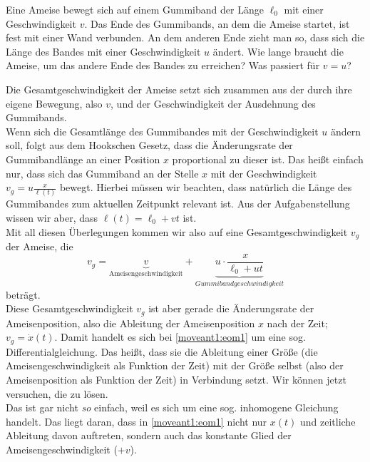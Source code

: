 \begin{Exercise}[label = moveant, origin = Jaan Kalda, difficulty = 3, title = Ameise auf dem Laufband]
	Eine Ameise bewegt sich auf einem Gummiband der Länge $\ell_0$ mit einer Geschwindigkeit $v$. Das Ende des Gummibands, an dem die Ameise startet, ist fest mit einer Wand verbunden. An dem anderen Ende zieht man so, dass sich die Länge des Bandes mit einer Geschwindigkeit $u$ ändert. Wie lange braucht die Ameise, um das andere Ende des Bandes zu erreichen? Was passiert für $v=u$?
\end{Exercise}
\begin{Answer}[ref = moveant]
	Die Gesamtgeschwindigkeit der Ameise setzt sich zusammen aus der durch ihre eigene Bewegung, also $v$, und der Geschwindigkeit der Ausdehnung des Gummibands.\\
	Wenn sich die Gesamtlänge des Gummibandes mit der Geschwindigkeit $u$ ändern soll, folgt aus dem Hookschen Gesetz, dass die Änderungsrate der Gummibandlänge an einer Position $x$ proportional zu dieser ist. Das heißt einfach nur, dass sich das Gummiband an der Stelle $x$ mit der Geschwindigkeit $v_g = u \frac{x}{\ell\left(t\right)}$ bewegt. Hierbei müssen wir beachten, dass natürlich die Länge des Gummibandes zum aktuellen Zeitpunkt relevant ist. Aus der Aufgabenstellung wissen wir aber, dass $\ell\left(t\right) = \ell_0 + v t $ ist. \\
	Mit all diesen Überlegungen kommen wir also auf eine Gesamtgeschwindigkeit $v_g$ der Ameise, die 
	\begin{equation}\label{moveant1:eom1}
	v_g = 	\underbrace{v}_{\mathrm{Ameisengeschwindigkeit}} +\underbrace{u\cdot \frac{x}{\ell_0 + u t}}_{Gummibandgeschwindigkeit}
	\end{equation}
	beträgt.\\
	Diese Gesamtgeschwindigkeit $v_g$ ist aber gerade die Änderungsrate der Ameisenposition, also die Ableitung der Ameisenposition $x$ nach der Zeit; $v_g = \dot{x}\left(t\right)$. Damit handelt es sich bei \eqref{moveant1:eom1} um eine sog. Differentialgleichung. Das heißt, dass sie die Ableitung einer Größe (die Ameisengeschwindigkeit als Funktion der Zeit) mit der Größe selbst (also der Ameisenposition als Funktion der Zeit) in Verbindung setzt. Wir können jetzt versuchen, die zu lösen.\\
	Das ist gar nicht \textit{so} einfach, weil es sich um eine sog. inhomogene Gleichung handelt. Das liegt daran, dass in \eqref{moveant1:eom1} nicht nur $x\left(t\right)$ und zeitliche Ableitung davon auftreten, sondern auch das konstante Glied der Ameisengeschwindigkeit ($+v$).\\

\end{Answer}
